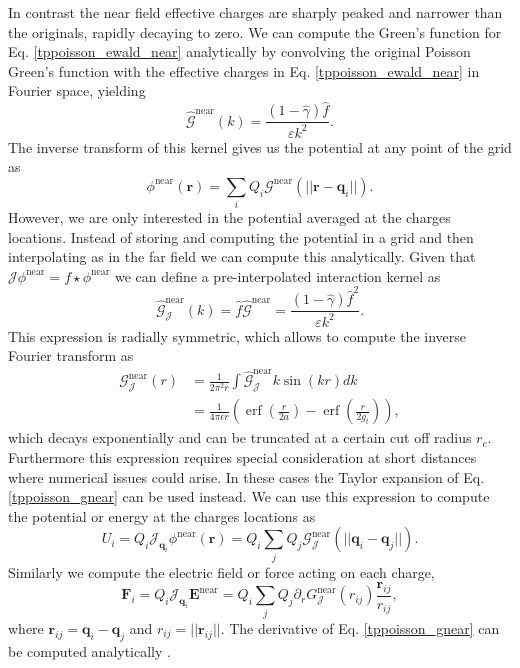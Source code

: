 \documentclass[twoside,openright,titlepage,numbers=noenddot,%
headinclude,footinclude,cleardoublepage=empty,abstract=on,
BCOR=5mm,fontsize=11pt, dvipsnames, paper=b5
]{scrreprt}
\renewcommand{\vec}[1]{\bm{#1}}
\newcommand{\oper}[1]{\mathcal{#1}}
\newcommand{\near}{\textrm{near}}
\DeclareMathOperator{\erf}{erf}
\newcommand{\ppos}{q}
\newcommand{\fpos}{r}
\begin{document}
In contrast the near field effective charges are sharply peaked and narrower than the originals, rapidly decaying to zero. We can compute the Green's function for Eq. \eqref{tppoisson_ewald_near} analytically by convolving the original Poisson Green's function with the effective charges in Eq. \eqref{tppoisson_ewald_near} in Fourier space, yielding
\begin{equation}
  \hat{\oper{G}}^{\near}(k) = \frac{(1-\hat{\gamma})\hat{f}}{\varepsilon k^2}.
\end{equation}
The inverse transform of this kernel gives us the potential at any point of the grid as
\begin{equation}
  \phi^{\near}(\vec{\fpos}) = \sum_i{Q_i\oper{G}^{\near}(||\vec{\fpos}-\vec{\ppos}_i||)}.
\end{equation}
However, we are only interested in the potential averaged at the charges locations. Instead of storing and computing the potential in a grid and then interpolating as in the far field we can compute this analytically. Given that $\oper{J} \phi^{\near} = f\star \phi^{\near}$ we can define a pre-interpolated interaction kernel as
\begin{equation}
  \hat{\oper{G}}_{\oper{J}}^{\near}(k) = \hat{f}\hat{\oper{G}}^{\near} = \frac{(1-\hat{\gamma})\hat{f}^2}{\varepsilon k^2}.
\end{equation}
This expression is radially symmetric, which allows to compute the inverse Fourier transform as
\begin{equation}
  \label{tppoisson_gnear}
  \begin{aligned}
    \oper{G}_{\oper{J}}^{\near}(r) &= \frac{1}{2\pi^2r}\int{\hat{\oper{G}}^{\near}_{\oper{J}}k \sin(kr)dk} \\
            &= \frac{1}{4\pi\epsilon r}\left(\erf\left(\frac{r}{2a}\right) - \erf\left(\frac{r}{2g_t}\right)\right),
  \end{aligned}
\end{equation}
which decays exponentially and can be truncated at a certain cut off radius $r_c$. Furthermore this expression requires special consideration at short distances where numerical issues could arise. In these cases the Taylor expansion of Eq. \eqref{tppoisson_gnear} can be used instead.
We can use this expression to compute the potential or energy at the charges locations as
\begin{equation}
  U_i = Q_i\oper{J}_{\vec{\ppos}_i}\phi^{\near}(\vec{\fpos}) = Q_i\sum_j{Q_j\oper{G}_{\oper{J}}^{\near}(||\vec{\ppos}_i - \vec{\ppos}_j||)}.
\end{equation}
Similarly we compute the electric field or force acting on each charge,
\begin{equation}
  \vec{F}_i = Q_i \oper{J}_{\vec{\ppos}_i} \vec{E}^{\near} = Q_i\sum_j{Q_j\partial_r G_{\oper{J}}^{\near}({r_{ij}})\frac{\vec{r}_{ij}}{r_{ij}}},
\end{equation}
where $\vec{r}_{ij} = \vec{\ppos}_i - \vec{\ppos}_j$ and $r_{ij} = ||\vec{r}_{ij}||$. The derivative of Eq. \eqref{tppoisson_gnear} can be computed analytically \cite{Maxian2021}.
\end{document}
